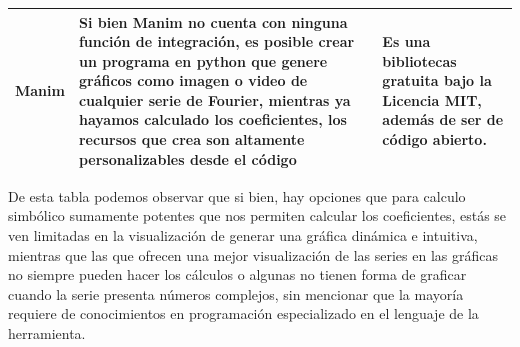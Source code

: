 \begin{longtable}{ | c | m{6.5cm} | m{4.5cm} | }
	Manim & Si bien Manim no cuenta con ninguna función de integración, es posible crear un programa en python que genere gráficos como imagen o video de cualquier serie de Fourier, mientras ya hayamos calculado los coeficientes, los recursos que crea son altamente personalizables desde el código  & Es una bibliotecas gratuita bajo la Licencia MIT, además de ser de código abierto. \\ \hline
	
\end{longtable}
 \label{tabla:Comparativa de los sistemas vistos en función de las series de Fourier}
\vspace{0.5cm}



De esta tabla podemos observar que si bien, hay opciones que para calculo simbólico sumamente potentes que nos permiten calcular los coeficientes, estás se ven limitadas en la visualización de generar una gráfica dinámica e intuitiva, mientras que las que ofrecen una mejor visualización de las series en las gráficas no siempre pueden hacer los cálculos o algunas no tienen forma de graficar cuando la serie presenta números complejos, sin mencionar que la mayoría requiere de conocimientos en programación especializado en el lenguaje de la herramienta.



